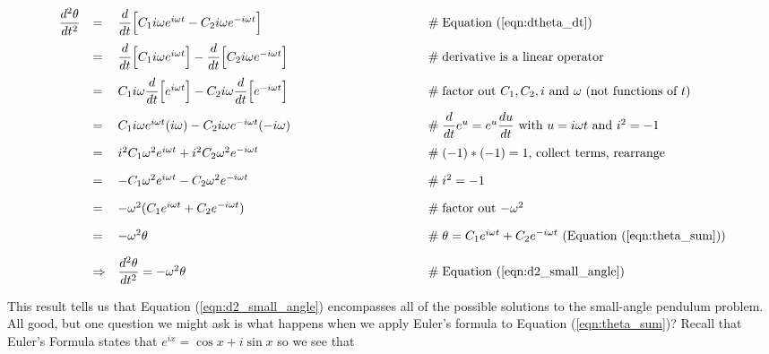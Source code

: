 \documentclass{article}
\theoremstyle{definition}
\begin{document}
\begin{equation*}
\begin{array}{llll}
\dfrac{d^2 \theta}{dt^2} 
&=& \dfrac{d}{dt} \Big [ C_1 i \omega e^{i \omega t} - C_2 i \omega e^{-i \omega t} \Big ]		
		&\qquad \qquad \qquad \qquad \qquad \mathrel{\#} \text{Equation (\ref{eqn:dtheta_dt})} \\
[10pt]
&=& \dfrac{d}{dt} \Big [ C_1 i \omega e^{i \omega t} \Big ] - \dfrac{d}{dt} \Big [C_2 i \omega e^{-i \omega t} \Big ]		
		&\qquad \qquad \qquad \qquad \qquad \mathrel{\#} \text{derivative is a linear operator} \\
[10pt]
&=& C_1 i \omega \dfrac{d}{dt} \Big [e^{i \omega t} \Big ] - C_2 i \omega \dfrac{d}{dt} \Big [e^{-i \omega t} \Big ]		
		&\qquad \qquad \qquad \qquad \qquad \mathrel{\#} \text{factor out $C_1, C_2, i$ and $\omega$ (not functions of $t$)} \\
[10pt]
&=& C_1 i \omega e^{i \omega t} (i \omega) - C_2 i \omega  e^{-i \omega t} (-i \omega)
		&\qquad \qquad \qquad \qquad \qquad \mathrel{\#} \text{$\dfrac{d}{dt} e^u = e^u \dfrac{du}{dt}$ with $u =i \omega t$ and $i^2 = -1$} \\
[10pt]
&=& i^2 C_1 \omega^2 e^{i \omega t} + i^2 C_2 \omega^2 e^{-i \omega t}
		&\qquad \qquad \qquad \qquad \qquad \mathrel{\#} \text{$(-1) * (-1)  = 1$, collect terms, rearrange} \\
[10pt]
&=& - C_1 \omega^2 e^{i \omega t} - C_2 \omega^2 e^{-i \omega t}
		&\qquad \qquad \qquad \qquad \qquad \mathrel{\#} i^2 = -1 \\
[10pt]
&=& - \omega^2 (C_1 e^{i \omega t} + C_2 e^{-i \omega t}) 
		&\qquad \qquad \qquad \qquad \qquad \mathrel{\#} \text{factor out $- \omega^2$} \\
[10pt]
&=& - \omega^2 \theta
		&\qquad \qquad \qquad \qquad \qquad \mathrel{\#} \text{$\theta = C_1 e^{i \omega t} + C_2 e^{-i \omega t}$ (Equation (\ref{eqn:theta_sum}))} \\
[10pt]
&\Rightarrow& \dfrac{d^2 \theta}{dt^2} = - \omega^2 \theta 
		&\qquad \qquad \qquad \qquad \qquad \mathrel{\#} \text{Equation (\ref{eqn:d2_small_angle})}

\end{array}
\end{equation*}

\bigskip
\noindent
This result tells us that Equation (\ref{eqn:d2_small_angle})
encompasses all of the possible solutions to the small-angle
pendulum problem. All good, but one question we might ask is what
happens when we apply Euler's formula \cite{notes:eulers_formula}
to Equation (\ref{eqn:theta_sum})? Recall that Euler's Formula
states that $e^{ix} = \cos x + i \sin x$ so we see that
\end{document}
